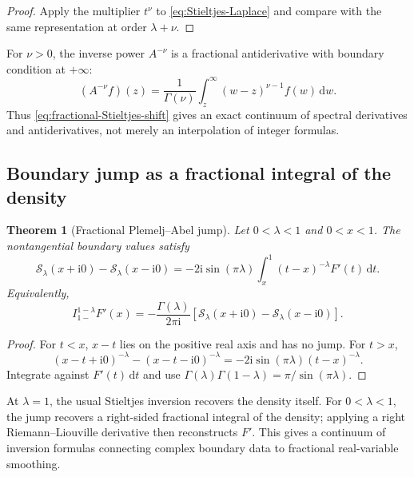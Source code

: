 \documentclass[11pt,oneside]{article}
\newtheorem{theorem}{Theorem}[section]
\theoremstyle{definition}
\theoremstyle{remark}
\newcommand{\dd}{\,\mathrm d}
\newcommand{\ii}{\mathrm i}
\newcommand{\Sord}{\mathcal S}
\begin{document}
\begin{proof}
Apply the multiplier $t^\nu$ to \eqref{eq:Stieltjes-Laplace} and compare with
the same representation at order $\lambda+\nu$.
\end{proof}

For $\nu>0$, the inverse power $A^{-\nu}$ is a fractional antiderivative with
boundary condition at $+\infty$:
\begin{equation}
 (A^{-\nu}f)(z)
 =\frac1{\Gamma(\nu)}\int_z^\infty(w-z)^{\nu-1}f(w)\dd w.
 \label{eq:right-infinity-antiderivative}
\end{equation}
Thus \eqref{eq:fractional-Stieltjes-shift} gives an exact continuum of
spectral derivatives and antiderivatives, not merely an interpolation of
integer formulas.

\subsection{Boundary jump as a fractional integral of the density}

\begin{theorem}[Fractional Plemelj--Abel jump]
\label{thm:Stieltjes-jump}
Let $0<\lambda<1$ and $0<x<1$.  The nontangential boundary values satisfy
\begin{equation}
 \Sord_\lambda(x+\ii0)-\Sord_\lambda(x-\ii0)
 =-2\ii\sin(\pi\lambda)
  \int_x^1(t-x)^{-\lambda}F'(t)\dd t.
 \label{eq:Stieltjes-jump}
\end{equation}
Equivalently,
\begin{equation}
 I_{1-}^{1-\lambda}F'(x)
 =-\frac{\Gamma(\lambda)}{2\pi\ii}
  \left[\Sord_\lambda(x+\ii0)-\Sord_\lambda(x-\ii0)\right].
 \label{eq:fractional-Stieltjes-inversion}
\end{equation}
\end{theorem}

\begin{proof}
For $t<x$, $x-t$ lies on the positive real axis and has no jump.  For $t>x$,
\begin{equation}
 (x-t+\ii0)^{-\lambda}-(x-t-\ii0)^{-\lambda}
 =-2\ii\sin(\pi\lambda)(t-x)^{-\lambda}.
\end{equation}
Integrate against $F'(t)\dd t$ and use
$\Gamma(\lambda)\Gamma(1-\lambda)=\pi/\sin(\pi\lambda)$.
\end{proof}

At $\lambda=1$, the usual Stieltjes inversion recovers the density itself.
For $0<\lambda<1$, the jump recovers a right-sided fractional integral of the
density; applying a right Riemann--Liouville derivative then reconstructs
$F'$.  This gives a continuum of inversion formulas connecting complex
boundary data to fractional real-variable smoothing.
\end{document}
